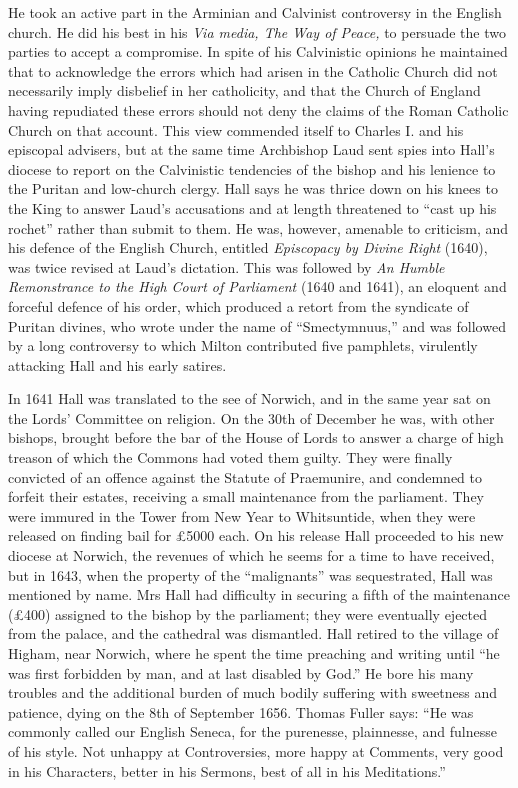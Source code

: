 He took an active part in the Arminian and Calvinist controversy in the English church. He did his best in his \emph{Via media, The Way of Peace,} to persuade the two parties to accept a compromise. In spite of his Calvinistic opinions he maintained that to acknowledge the errors which had arisen in the Catholic Church did not necessarily imply disbelief in her catholicity, and that the Church of England having repudiated these errors should not deny the claims of the Roman Catholic Church on that account. This view commended itself to Charles I. and his episcopal advisers, but at the same time Archbishop Laud sent spies into Hall's diocese to report on the Calvinistic tendencies of the bishop and his lenience to the Puritan and low-church clergy. Hall says he was thrice down on his knees to the King to answer Laud's accusations and at length threatened to ``cast up his rochet'' rather than submit to them. He was, however, amenable to criticism, and his defence of the English Church, entitled \emph{Episcopacy by Divine Right} (1640), was twice revised at Laud's dictation. This was followed by \emph{An Humble Remonstrance to the High Court of Parliament} (1640 and 1641), an eloquent and forceful defence of his order, which produced a retort from the syndicate of Puritan divines, who wrote under the name of ``Smectymnuus,'' and was followed by a long controversy to which Milton contributed five pamphlets, virulently attacking Hall and his early satires.

In 1641 Hall was translated to the see of Norwich, and in the same year sat on the Lords' Committee on religion. On the 30th of December he was, with other bishops, brought before the bar of the House of Lords to answer a charge of high treason of which the Commons had voted them guilty. They were finally convicted of an offence against the Statute of Praemunire, and condemned to forfeit their estates, receiving a small maintenance from the parliament. They were immured in the Tower from New Year to Whitsuntide, when they were released on finding bail for £5000 each. On his release Hall proceeded to his new diocese at Norwich, the revenues of which he seems for a time to have received, but in 1643, when the property of the ``malignants'' was sequestrated, Hall was mentioned by name. Mrs Hall had difficulty in securing a fifth of the maintenance (£400) assigned to the bishop by the parliament; they were eventually ejected from the palace, and the cathedral was dismantled. Hall retired to the village of Higham, near Norwich, where he spent the time preaching and writing until ``he was first forbidden by man, and at last disabled by God.'' He bore his many troubles and the additional burden of much bodily suffering with sweetness and patience, dying on the 8th of September 1656. Thomas Fuller says: ``He was commonly called our English Seneca, for the purenesse, plainnesse, and fulnesse of his style. Not unhappy at Controversies, more happy at Comments, very good in his Characters, better in his Sermons, best of all in his Meditations.''

